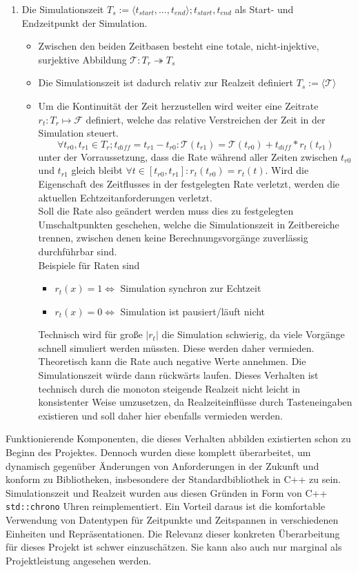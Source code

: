 \begin{enumerate}
\item Die Simulationszeit $T_s:=\langle t_{start}, ... , t_{end}\rangle; t_{start}, t_{end}$ als Start- und Endzeitpunkt der Simulation.
	\begin{itemize}
	\item Zwischen den beiden Zeitbasen besteht eine totale, nicht-injektive, surjektive Abbildung $\mathcal{T}:T_r \twoheadrightarrow T_s$
	\item Die Simulationszeit ist dadurch relativ zur Realzeit definiert $T_s:=\langle\mathcal{T}\rangle$
	\item Um die Kontinuität der Zeit herzustellen wird weiter eine Zeitrate $r_t:T_r\mapsto\mathcal{F}$ definiert, welche das relative Verstreichen der Zeit in der Simulation steuert. 
	$$\forall t_{r0},  t_{r1} \in T_r ; t_{diff}=t_{r1}-t_{r0} :\mathcal{T}(t_{r1}) = \mathcal{T}(t_{r0}) + t_{diff}*r_t(t_{r1})$$ unter der Vorraussetzung, dass die Rate während aller Zeiten zwischen $t_{r0}$ und $t_{r1}$ gleich bleibt $\forall t \in [ t_{r0},t_{r1}]: r_t( t_{r0}) = r_t(t)$. Wird die Eigenschaft des Zeitflusses in der festgelegten Rate verletzt, werden die aktuellen Echtzeitanforderungen verletzt. \\
	Soll die Rate also geändert werden muss dies zu festgelegten Umschaltpunkten geschehen, welche die Simulationszeit in Zeitbereiche trennen, zwischen denen keine Berechnungsvorgänge zuverlässig durchführbar sind.\\
Beispiele für Raten sind 
\begin{itemize}
\item $r_t(x) = 1 \Leftrightarrow$ Simulation synchron zur Echtzeit
\item $r_t(x) = 0 \Leftrightarrow$ Simulation ist pausiert/läuft nicht
\end{itemize}
Technisch wird für große $|r_t|$ die Simulation schwierig, da viele Vorgänge schnell simuliert werden müssten. Diese werden daher vermieden.\\
Theoretisch kann die Rate auch negative Werte annehmen. Die Simulationszeit würde dann rückwärts laufen. Dieses Verhalten ist technisch durch die monoton steigende Realzeit nicht leicht in konsistenter Weise umzusetzen, da Realzeiteinflüsse durch Tasteneingaben existieren und soll daher hier ebenfalls vermieden werden.
	\end{itemize}
\end{enumerate}	

Funktionierende Komponenten, die dieses Verhalten abbilden existierten schon zu Beginn des Projektes. Dennoch wurden diese komplett überarbeitet, um dynamisch gegenüber Änderungen von Anforderungen in der Zukunft und konform zu Bibliotheken, insbesondere der Standardbibliothek in C++ zu sein. Simulationszeit und Realzeit wurden aus diesen Gründen in Form von C++ \texttt{std::chrono} Uhren reimplementiert. Ein Vorteil daraus ist die komfortable Verwendung von Datentypen für Zeitpunkte und Zeitspannen in verschiedenen Einheiten und Repräsentationen. Die Relevanz dieser konkreten Überarbeitung für dieses Projekt ist schwer einzuschätzen. Sie kann also auch nur marginal als Projektleistung angesehen werden.


